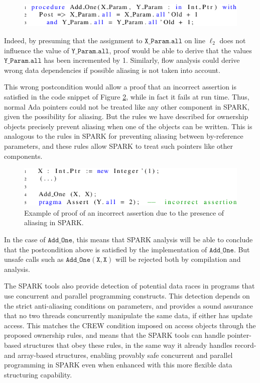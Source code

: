 \documentclass[runningheads]{llncs}
\newcommand\var[1]{\ensuremath{\mathtt{#1}}}
\begin{document}
\begin{figure}[htb!]
\centering
  \captionsetup{justification=centering,margin=0.6cm}
   \includegraphics[]{spark_ex1_proof}
   \label{fig:spark_ex1_proof}
\end{figure}

Indeed, by presuming that the assignment to \var{X\_Param.all} on line $\ell_2$ does not influence the value of \var{Y\_Param.all}, proof would be able to
derive that the values \var{Y\_Param.all} has been incremented by 1. Similarly, flow analysis could derive wrong data dependencies if possible aliasing is not taken into account.

This wrong postcondition would allow a proof that an incorrect assertion is satisfied in the code snippet of Figure \ref{fig:spark_ex1_exp}, while in fact it fails at run time.
Thus, normal Ada pointers could not be treated like any other component in SPARK, given the possibility
for aliasing. But the rules we have described for ownership objects precisely prevent
aliasing when one of the objects can be written. This is analogous to the rules in SPARK for preventing aliasing between by-reference parameters, and these rules allow SPARK to treat such pointers
like other components.

\begin{figure}[htb!]
\centering
  \captionsetup{justification=centering,margin=0.6cm}
   \includegraphics[]{spark_ex1_exp}
	\caption{Example of proof of an incorrect assertion due to the presence of aliasing in SPARK.}
   \label{fig:spark_ex1_exp}
\end{figure}



In the case of \var{Add\_One}, this means that SPARK analysis will be able to conclude that the postcondition above is satisfied by the implementation of \var{Add\_One}.
But unsafe calls such as \var{Add\_One(X,X)} will be rejected both by compilation and analysis.

The SPARK tools also provide detection of potential data races
in programs that use concurrent and parallel programming constructs.
This detection depends on the strict anti-aliasing conditions on parameters,
and provides a sound assurance that no two threads concurrently manipulate
the same data, if either has update access.  This matches the
CREW condition imposed on access objects through the proposed ownership
rules, and means that the SPARK tools can handle pointer-based structures that
obey these rules, in the
same way it already handles record- and array-based structures, enabling
provably safe concurrent and parallel programming in SPARK even when enhanced with
this more flexible data structuring capability.
\end{document}
